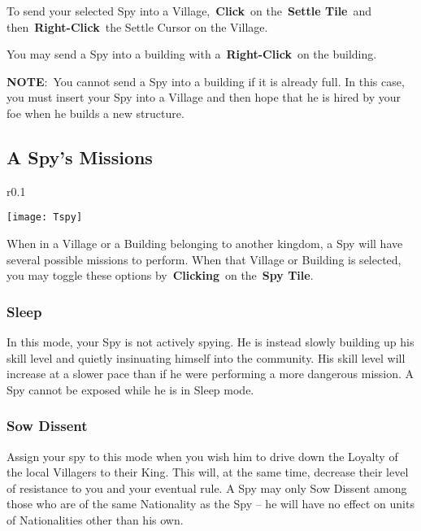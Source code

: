 To send your selected Spy into a Village, \textbf{Click} on the \textbf{Settle Tile} and then \textbf{Right-Click} the Settle Cursor on the Village.

You may send a Spy into a building with a \textbf{Right-Click} on the building.

\textbf{NOTE}: You cannot send a Spy into a building if it is already full. In this case, you must insert your Spy into a Village and then hope that he is hired by your foe when he builds a new structure.

\subsection{A Spy’s Missions}

\begin{wrapfigure}{r}{0.1\textwidth}
	\vspace{-20pt}
	\begin{center}
		\texttt{[image: Tspy]}
	\end{center}
	\vspace{-20pt}
\end{wrapfigure}

When in a Village or a Building belonging to another kingdom, a Spy will have several possible missions to perform. When that Village or Building is selected, you may toggle these options by \textbf{Clicking} on the \textbf{Spy Tile}.

\subsubsection{Sleep}

In this mode, your Spy is not actively spying. He is instead slowly building up his skill level and quietly insinuating himself into the community. His skill level will increase at a slower pace than if he were performing a more dangerous mission. A Spy cannot be exposed while he is in Sleep mode.

\subsubsection{Sow Dissent}

Assign your spy to this mode when you wish him to drive down the Loyalty of the local Villagers to their King. This will, at the same time, decrease their level of resistance to you and your eventual rule. A Spy may only Sow Dissent among those who are of the same Nationality as the Spy -- he will have no effect on units of Nationalities other than his own.

